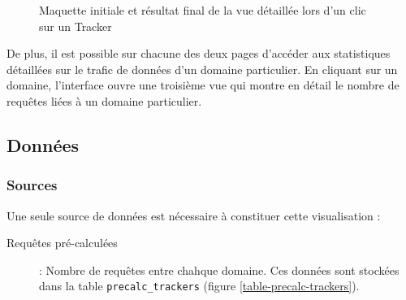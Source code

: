 		\begin{figure}[p]
			\centering

			\caption{Maquette initiale et résultat final de la vue détaillée lors d'un clic sur un Tracker}
			\label{tracker_images}
		\end{figure}

		De plus, il est possible sur chacune des deux pages d'accéder aux statistiques détaillées sur le trafic de données d'un domaine particulier. En cliquant sur un domaine, l'interface ouvre une troisième vue qui montre en détail le nombre de requêtes liées à un domaine particulier.

	\newpage

	\subsection{Données}

		\subsubsection{Sources}

			Une seule source de données est nécessaire à constituer cette visualisation :
			\begin{description}
				\item[Requêtes pré-calculées] : Nombre de requêtes entre chahque domaine. Ces données sont stockées dans la table \texttt{precalc\_trackers} (figure \ref{table-precalc-trackers}).
			\end{description}

